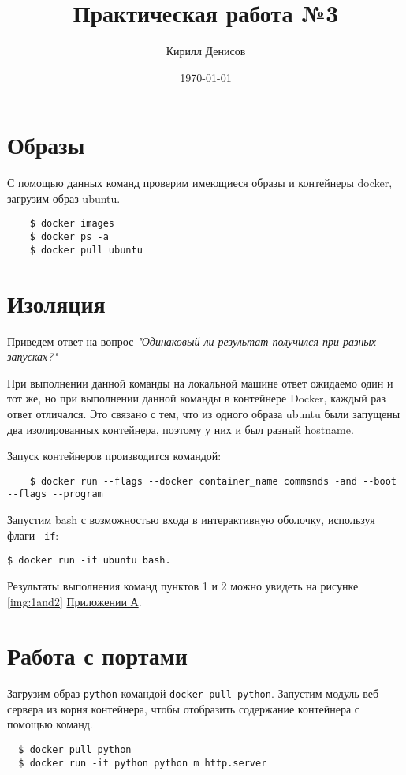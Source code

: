 \documentclass[a4paper,14pt]{extarticle}
\author{Кирилл Денисов}
\title{Практическая работа №3}
\date{\today}
\newcommand{\pathToCommonFolder}{/home/denilai/Desktop/LaTeX/Common}
\begin{document}
	\thispagestyle{empty}
	
	
	
	\newpage
	\tableofcontents
	\newpage

\section{Образы}
С помощью данных команд проверим имеющиеся образы и контейнеры docker, загрузим образ ubuntu.
\begin{lstlisting}
	$ docker images
	$ docker ps -a
	$ docker pull ubuntu
\end{lstlisting}


\section {Изоляция}
Приведем ответ на вопрос \textit{"Одинаковый ли результат получился при разных запусках?"}

При выполнении данной команды на локальной машине ответ ожидаемо один и тот же, но при выполнении данной команды в контейнере Docker, каждый раз ответ отличался. Это связано с тем, что из одного образа ubuntu были запущены два изолированных контейнера, поэтому у них и был разный hostname.

Запуск контейнеров производится командой:
\begin{lstlisting}
	$ docker run --flags --docker container_name commsnds -and --boot --flags --program
\end{lstlisting}

Запустим bash с возможностью входа в интерактивную оболочку, используя флаги \texttt{-if}:
\begin{lstlisting}
$ docker run -it ubuntu bash.
\end{lstlisting}

Результаты выполнения команд  пунктов 1 и 2 можно увидеть на рисунке \ref{img:1and2} \hyperref[A]{Приложении А}.



\section{Работа с портами}
Загрузим образ \texttt{python} командой \texttt{docker pull python}. Запустим модуль веб-сервера из корня контейнера, чтобы отобразить содержание контейнера с помощью команд.
\begin{lstlisting}
  $ docker pull python
  $ docker run -it python python m http.server
\end{lstlisting}
\end{document}
